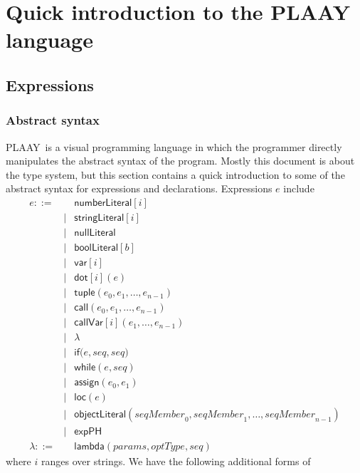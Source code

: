 \documentclass[12pt]{article}
\begin{document}
\section{Quick introduction to the PLAAY language}

\subsection{Expressions}

\subsubsection{Abstract syntax}

PLAAY\ is a visual programming language in which the programmer directly
manipulates the abstract syntax of the program. Mostly this document is
about the type system, but this section contains a quick introduction to
some of the abstract syntax for expressions and declarations. Expressions $e$
include%
\begin{eqnarray*}
e ::=&&\mathsf{numberLiteral}\left[ i\right] \\
&\mid &\mathsf{stringLiteral}[i] \\
&\mid &\mathsf{nullLiteral} \\
&\mid &\mathsf{boolLiteral}[b] \\
&\mid &\mathsf{var}[i] \\
&\mid &\mathsf{dot}\left[ i\right] (e) \\
&\mid &\mathsf{tuple}\left( e_{0},e_{1},\ldots ,e_{n-1}\right) \\
&\mid &\mathsf{call}(e_{0},e_{1},\ldots ,e_{n-1}) \\
&\mid &\mathsf{callVar}[i](e_{1},\ldots ,e_{n-1}) \\
&\mid &\lambda \\
&\mid &\mathsf{if}(e,\mathit{seq},\mathit{seq)} \\
&\mid &\mathsf{while}\left( e,\mathit{seq}\right) \\
&\mid &\mathsf{assign}(e_{0},e_{1}) \\
&\mid &\mathsf{loc}\left( e\right) \\
&\mid &\mathsf{objectLiteral}\left( \mathit{seqMember}_{0},\mathit{seqMember}%
_{1},\ldots ,\mathit{seqMember}_{n-1}\right) \\
&\mid &\mathsf{expPH} \\
\lambda ::=&&\mathsf{lambda}(\mathit{params},\mathit{optType,seq})
\end{eqnarray*}%
where $i$ ranges over strings. We have the following additional forms of
\end{document}
